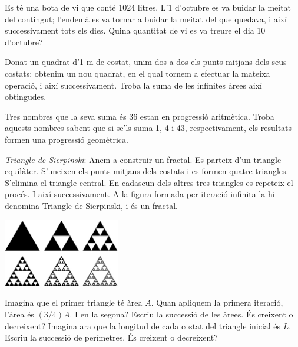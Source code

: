 \begin{activitats}
\begin{mylist}
\exer  Es té una bota de vi que conté 1024 litres. L'1 d'octubre es va buidar la meitat del contingut; l'endemà es va tornar a buidar la meitat del que quedava, i així successivament tots els dies. Quina quantitat de vi es va treure el dia 10 d'octubre? 

\exer  Donat un quadrat d'1 m de costat, unim dos a dos els punts mitjans dels seus costats; obtenim un nou quadrat, en el qual tornem a efectuar la mateixa operació, i així successivament. Troba la suma de les infinites àrees així obtingudes.

\exer  Tres nombres que la seva suma és 36 estan en progressió aritmètica. Troba aquests nombres sabent que si se'ls suma 1, 4 i 43, respectivament, els resultats formen una progressió geomètrica. 
\answers{[PG: 4; 16 i 64, PA: 3; 12 i 21]}

\exer[1] 
\textit{Triangle de Sierpinski}: Anem a construir un fractal. Es parteix d'un triangle equilàter. S'uneixen els punts mitjans dels costats i es formen quatre triangles. S'elimina el triangle central. En cadascun dels altres tres triangles es repeteix el procés. I així successivament. A la figura formada per iteració infinita la hi denomina Triangle de Sierpinski, i és un fractal.
 	\begin{center}
	\includegraphics*[width=0.38\textwidth]{img-03/sierpinski}
\end{center} 

 Imagina que el primer triangle té àrea $A$. Quan apliquem la primera iteració, l'àrea és $(3/4)A$. I en la segona? Escriu la successió de les àrees. És creixent o decreixent? Imagina ara que la longitud de cada costat del triangle inicial és $L$. Escriu la successió de perímetres. És creixent o decreixent? 
 \answers{[$A_n = A \cdot (3/4)^{n-1}$ decreixent, $P_n = 3L \cdot (3/2)^{n-1}$ creixent]}

\end{mylist}
 
\end{activitats}

